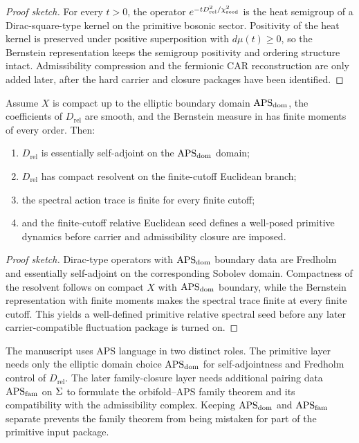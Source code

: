 \begin{proof}[Proof sketch]
For every $t>0$, the operator $e^{-tD_{\mathrm{rel}}^2/\chi_{\mathrm{seed}}^2}$ is the heat semigroup of a Dirac-square-type kernel on the primitive bosonic sector. Positivity of the heat kernel is preserved under positive superposition with $d\mu(t)\ge0$, so the Bernstein representation keeps the semigroup positivity and ordering structure intact. Admissibility compression and the fermionic CAR reconstruction are only added later, after the hard carrier and closure packages have been identified.
\end{proof}

\begin{theorem}
Assume $X$ is compact up to the elliptic boundary domain $\mathrm{APS}_{\mathrm{dom}}$, the coefficients of $D_{\mathrm{rel}}$ are smooth, and the Bernstein measure in  has finite moments of every order. Then:
\begin{enumerate}[label=(\alph*), leftmargin=1.5em, topsep=3pt, itemsep=2pt]
    \item $D_{\mathrm{rel}}$ is essentially self-adjoint on the $\mathrm{APS}_{\mathrm{dom}}$ domain;
    \item $D_{\mathrm{rel}}$ has compact resolvent on the finite-cutoff Euclidean branch;
    \item the spectral action trace is finite for every finite cutoff;
    \item and the finite-cutoff relative Euclidean seed defines a well-posed primitive dynamics before carrier and admissibility closure are imposed.
\end{enumerate}
\end{theorem}

\begin{proof}[Proof sketch]
Dirac-type operators with $\mathrm{APS}_{\mathrm{dom}}$ boundary data are Fredholm and essentially self-adjoint on the corresponding Sobolev domain. Compactness of the resolvent follows on compact $X$ with $\mathrm{APS}_{\mathrm{dom}}$ boundary, while the Bernstein representation with finite moments makes the spectral trace finite at every finite cutoff. This yields a well-defined primitive relative spectral seed before any later carrier-compatible fluctuation package is turned on.
\end{proof}

\begin{remark}
The manuscript uses APS language in two distinct roles. The primitive layer needs only the elliptic domain choice $\mathrm{APS}_{\mathrm{dom}}$ for self-adjointness and Fredholm control of $D_{\mathrm{rel}}$. The later family-closure layer needs additional pairing data $\mathrm{APS}_{\mathrm{fam}}$ on $\Sigma$ to formulate the orbifold--APS family theorem and its compatibility with the admissibility complex. Keeping $\mathrm{APS}_{\mathrm{dom}}$ and $\mathrm{APS}_{\mathrm{fam}}$ separate prevents the family theorem from being mistaken for part of the primitive input package.
\end{remark}

